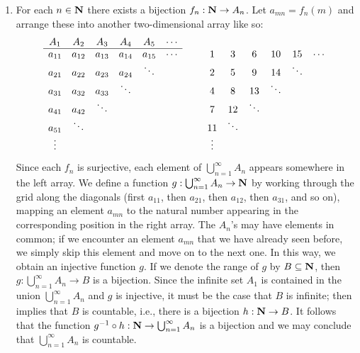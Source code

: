 \documentclass{lew98_solutions}
\begin{document}
\begin{solution}
\begin{enumerate}
        \item For each \( n \in \mathbf{N} \) there exists a bijection \( f_n : \mathbf{N} \to A_n \). Let \( a_{mn} = f_n(m) \) and arrange these into another two-dimensional array like so:
        \[
            \begin{array}[b]{cccccc}
            A_1 & A_2 & A_3 & A_4 & A_5 & \cdots \\
            \hline
            a_{11} & a_{12} & a_{13} & a_{14} & a_{15} & \cdots \\
            a_{21} & a_{22} & a_{23} & a_{24} & \ddots \\
            a_{31} & a_{32} & a_{33} & \ddots \\
            a_{41} & a_{42} & \ddots \\
            a_{51} & \ddots \\
            \vdots
            \end{array}
            \qquad
            \begin{array}[b]{cccccc}
            1 & 3 & 6 & 10 & 15 & \cdots \\
            2 & 5 & 9 & 14 & \ddots \\
            4 & 8 & 13 & \ddots \\
            7 & 12 & \ddots \\
            11 & \ddots \\
            \vdots
            \end{array}
        \]
        Since each \( f_n \) is surjective, each element of \( \bigcup_{n=1}^{\infty} A_n \) appears somewhere in the left array. We define a function \( g : \bigcup_{n=1}^{\infty} A_n \to \mathbf{N} \) by working through the grid along the diagonals (first \( a_{11} \), then \( a_{21} \), then \( a_{12} \), then \( a_{31} \), and so on), mapping an element \( a_{mn} \) to the natural number appearing in the corresponding position in the right array. The \( A_n \)'s may have elements in common; if we encounter an element \( a_{mn} \) that we have already seen before, we simply skip this element and move on to the next one. In this way, we obtain an injective function \( g \). If we denote the range of \( g \) by \( B \subseteq \mathbf{N} \), then \( g : \bigcup_{n=1}^{\infty} A_n \to B \) is a bijection. Since the infinite set \( A_1 \) is contained in the union \( \bigcup_{n=1}^{\infty} A_n \) and \( g \) is injective, it must be the case that \( B \) is infinite;  then implies that \( B \) is countable, i.e., there is a bijection \( h : \mathbf{N} \to B \). It follows that the function \( g^{-1} \circ h : \mathbf{N} \to \bigcup_{n=1}^{\infty} A_n \) is a bijection and we may conclude that \( \bigcup_{n=1}^{\infty} A_n \) is countable.
    \end{enumerate}
\end{solution}
\end{document}
